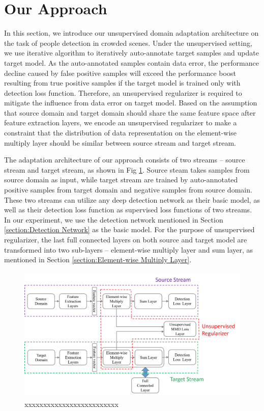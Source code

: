 \documentclass[runningheads]{llncs}
\begin{document}
\section{Our Approach}
\label{section:Our Approach}

In this section, we introduce our unsupervised domain adaptation architecture on the task of people detection in crowded scenes. Under the unsupervised setting, we use iterative algorithm to iteratively auto-annotate target samples and update target model. As the auto-annotated samples contain data error, the performance decline caused by false positive samples will exceed the performance boost resulting from true positive samples if the target model is trained only with detection loss function. Therefore, an unsupervised regularizer is required to mitigate the influence from data error on target model. Based on the assumption that source domain and target domain should share the same feature space after feature extraction layers, we encode an unsupervised regularizer to make a constraint that the distribution of data representation on the element-wise multiply layer should be similar between source stream and target stream.

The adaptation architecture of our approach consists of two streams -- source stream and target stream, as shown in Fig \ref{fig:streams}. Source steam takes samples from source domain as input, while target stream are trained by auto-annotated positive samples from target domain and negative samples from source domain. These two streams can utilize any deep detection network as their basic model, as well as their detection loss function as supervised loss functions of two streams. In our experiment, we use the detection network mentioned in Section \ref{section:Detection Network} as the basic model. For the purpose of unsupervised regularizer, the last full connected layers on both source and target model are transformed into two sub-layers -- element-wise multiply layer and sum layer, as mentioned in Section \ref{section:Element-wise Multiply Layer}.

\begin{figure}
\centering
\includegraphics[height=6.5cm]{images/streams.png}
\caption{xxxxxxxxxxxxxxxxxxxxxxxxx}
\label{fig:streams}
\end{figure}
\end{document}
